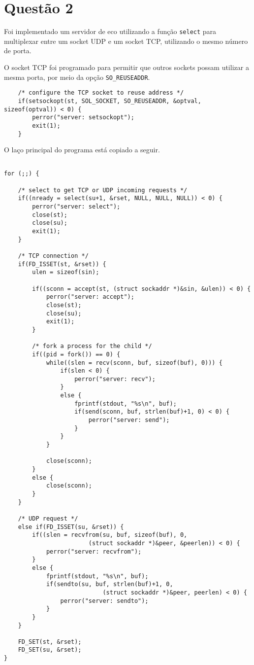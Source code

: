 \documentclass[a4paper,10pt]{article}
\begin{document}
\section{Questão 2}

Foi implementado um servidor de eco utilizando a função {\tt select} para multiplexar entre um socket UDP e um socket TCP, utilizando o mesmo número de porta.

O socket TCP foi programado para permitir que outros sockets possam utilizar a mesma porta, por meio da opção {\tt SO\_REUSEADDR}.

\begin{lstlisting}
    /* configure the TCP socket to reuse address */
    if(setsockopt(st, SOL_SOCKET, SO_REUSEADDR, &optval, sizeof(optval)) < 0) {
        perror("server: setsockopt");
        exit(1);
    }
\end{lstlisting}

O laço principal do programa está copiado a seguir.

\begin{lstlisting}

for (;;) {

    /* select to get TCP or UDP incoming requests */
    if((nready = select(su+1, &rset, NULL, NULL, NULL)) < 0) {
        perror("server: select");
        close(st);
        close(su);
        exit(1);
    }

    /* TCP connection */
    if(FD_ISSET(st, &rset)) {
        ulen = sizeof(sin);

        if((sconn = accept(st, (struct sockaddr *)&sin, &ulen)) < 0) {
            perror("server: accept");
            close(st);
            close(su);
            exit(1);
        }

        /* fork a process for the child */
        if((pid = fork()) == 0) {
            while((slen = recv(sconn, buf, sizeof(buf), 0))) {
                if(slen < 0) {
                    perror("server: recv");
                }
                else {
                    fprintf(stdout, "%s\n", buf);
                    if(send(sconn, buf, strlen(buf)+1, 0) < 0) {
                        perror("server: send");
                    }
                }
            }

            close(sconn);
        }
        else {
            close(sconn);
        }
    }

    /* UDP request */
    else if(FD_ISSET(su, &rset)) {
        if((slen = recvfrom(su, buf, sizeof(buf), 0,
                        (struct sockaddr *)&peer, &peerlen)) < 0) {
            perror("server: recvfrom");
        }
        else {
            fprintf(stdout, "%s\n", buf);
            if(sendto(su, buf, strlen(buf)+1, 0,
                            (struct sockaddr *)&peer, peerlen) < 0) {
                perror("server: sendto");
            }
        }
    }

    FD_SET(st, &rset);
    FD_SET(su, &rset);
}
\end{lstlisting}
\end{document}
